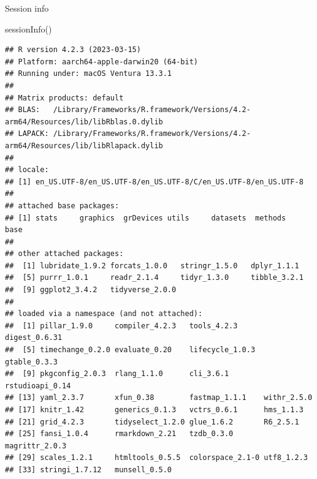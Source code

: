 \documentclass[
  ignorenonframetext,
]{beamer}
\newenvironment{Shaded}{\begin{snugshade}}{\end{snugshade}}
\newcommand{\FunctionTok}[1]{\textcolor[rgb]{0.00,0.00,0.00}{#1}}
\newcommand{\NormalTok}[1]{#1}
\begin{document}
\begin{frame}[fragile]{Session info}
\protect\hypertarget{session-info}{}
\tiny

\begin{Shaded}
\begin{Highlighting}[]
\FunctionTok{sessionInfo}\NormalTok{()}
\end{Highlighting}
\end{Shaded}

\begin{verbatim}
## R version 4.2.3 (2023-03-15)
## Platform: aarch64-apple-darwin20 (64-bit)
## Running under: macOS Ventura 13.3.1
## 
## Matrix products: default
## BLAS:   /Library/Frameworks/R.framework/Versions/4.2-arm64/Resources/lib/libRblas.0.dylib
## LAPACK: /Library/Frameworks/R.framework/Versions/4.2-arm64/Resources/lib/libRlapack.dylib
## 
## locale:
## [1] en_US.UTF-8/en_US.UTF-8/en_US.UTF-8/C/en_US.UTF-8/en_US.UTF-8
## 
## attached base packages:
## [1] stats     graphics  grDevices utils     datasets  methods   base     
## 
## other attached packages:
##  [1] lubridate_1.9.2 forcats_1.0.0   stringr_1.5.0   dplyr_1.1.1    
##  [5] purrr_1.0.1     readr_2.1.4     tidyr_1.3.0     tibble_3.2.1   
##  [9] ggplot2_3.4.2   tidyverse_2.0.0
## 
## loaded via a namespace (and not attached):
##  [1] pillar_1.9.0     compiler_4.2.3   tools_4.2.3      digest_0.6.31   
##  [5] timechange_0.2.0 evaluate_0.20    lifecycle_1.0.3  gtable_0.3.3    
##  [9] pkgconfig_2.0.3  rlang_1.1.0      cli_3.6.1        rstudioapi_0.14 
## [13] yaml_2.3.7       xfun_0.38        fastmap_1.1.1    withr_2.5.0     
## [17] knitr_1.42       generics_0.1.3   vctrs_0.6.1      hms_1.1.3       
## [21] grid_4.2.3       tidyselect_1.2.0 glue_1.6.2       R6_2.5.1        
## [25] fansi_1.0.4      rmarkdown_2.21   tzdb_0.3.0       magrittr_2.0.3  
## [29] scales_1.2.1     htmltools_0.5.5  colorspace_2.1-0 utf8_1.2.3      
## [33] stringi_1.7.12   munsell_0.5.0
\end{verbatim}
\end{frame}
\end{document}
